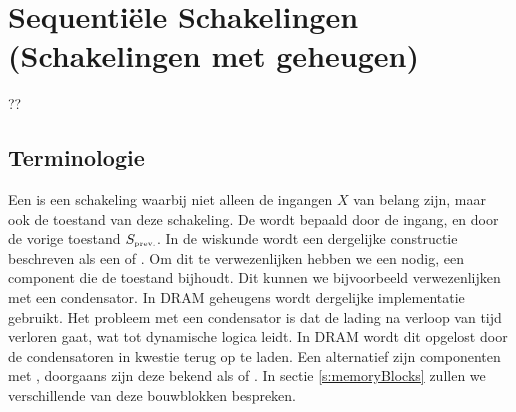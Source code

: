 \chapter{Sequenti\"ele Schakelingen (Schakelingen met geheugen)}
\begin{chapterintro}
??
\end{chapterintro}
\minitoc[n]
\section{Terminologie}
Een  is een schakeling waarbij niet alleen de ingangen $X$ van belang zijn, maar ook de toestand van deze schakeling. De  wordt bepaald door de ingang, en door de vorige toestand $S_{\mbox{\tiny{prev.}}}$. In de wiskunde wordt een dergelijke constructie beschreven als een  of . Om dit te verwezenlijken hebben we een  nodig, een component die de toestand bijhoudt. Dit kunnen we bijvoorbeeld verwezenlijken met een condensator. In DRAM geheugens wordt dergelijke implementatie gebruikt. Het probleem met een condensator is dat de lading na verloop van tijd verloren gaat, wat tot dynamische logica leidt. In DRAM wordt dit opgelost door de condensatoren in kwestie terug op te laden. Een alternatief zijn componenten met , doorgaans zijn deze bekend als  of . In sectie \ref{s:memoryBlocks} zullen we verschillende van deze bouwblokken bespreken.
